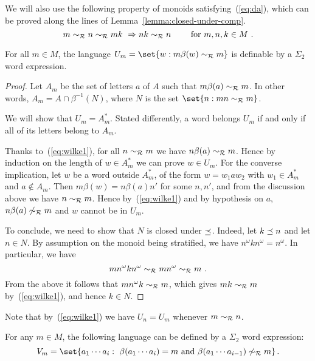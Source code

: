 \documentclass{LMCS}
\begin{document}
  We will also use the following property of monoids
  satisfying~(\ref{eq:da}), which can be proved along the lines of
  Lemma~\ref{lemma:closed-under-comp}.
\begin{equation}\label{eq:wilke1}
 m \sim_{\mathcal R} n \sim_{\mathcal R} mk \ \Rightarrow nk \sim_{\mathcal R} n \qquad \mbox{ for
  }m,n,k \in M\ .
\end{equation}


\begin{lem}\label{lemma:wilke3}
  For all $m \in M$, the language $U_m=\set{w : m \beta(w) \rgreensim m}$ is
  definable by a $\Sigma_2$ word expression. 
\end{lem}
\begin{proof}
  Let $A_m$ be the set of letters $a$ of $A$ such that $m\beta(a) \sim_{\mathcal R}
  m$. In other words, $A_m = A \cap \beta^{-1}(N)$, where $N$ is the set
  $\set{n: mn\rgreensim m}$.

  We will show that $U_m = A_m^*$. Stated differently, a word belongs $U_m$ if
  and only if all of its letters belong to $A_m$.


  Thanks to~(\ref{eq:wilke1}), for all $n \sim_{\mathcal R} m$ we have $n\beta(a)
  \sim_{\mathcal R} m$. Hence by induction on the length of $w \in A_m^*$ we can prove
  $w \in U_m$. For the converse implication, let $w$ be a word outside $A_m^*$,
  of the form $w=w_1aw_2$ with $w_1 \in A_m^*$ and $a \not\in A_m$. Then
$m\beta(w) = n \beta(a) n'$ for some $n,n'$, and from the discussion above we
have $n \sim_{\mathcal R} m$. Hence by~(\ref{eq:wilke1}) and by hypothesis on $a$, $n
\beta(a) \not\sim_{\mathcal R} m$ and $w$ cannot be in $U_m$.

  

 To conclude, we need to show that $N$ is closed under $\preceq$.
 Indeed, let $k \preceq n$ and let $n \in N$. By assumption on the
 monoid being stratified, we have $n^\omega k n^\omega = n^\omega$. In
 particular, we have 
 \[
   mn^\omega k n^\omega \sim_{\mathcal R} mn^\omega \sim_{\mathcal R} m\ .
 \]
 From the above it follows that $mn^\omega k \sim_{\mathcal R} m$, which gives
 $mk \sim_{\mathcal R} m$ by~(\ref{eq:wilke1}), and hence $k \in N$.
\end{proof}

Note that by~(\ref{eq:wilke1}) we have $U_n=U_m$ whenever $m \sim_{\mathcal R} n$.

\begin{lem}\label{lemma:wilke4}
  For any $m \in M$, the following language can be defined by a
  $\Sigma_2$ word expression:
\[
V_m =  \set{a_1\cdots a_i: \ \beta(a_1 \cdots a_i)=m\mbox{ and }
  \beta(a_1 \cdots a_{i-1}) \not\rgreensim  m}\,.
\]
\end{lem}
\end{document}
